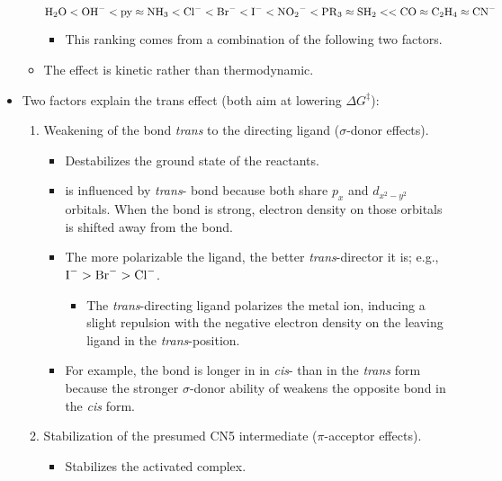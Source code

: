 \documentclass[../notes.tex]{subfiles}
\begin{document}
\begin{itemize}
\begin{itemize}
        \begin{equation*}
            \ce{H2O}<\ce{OH-}<\text{py}\approx\ce{NH3}<\ce{Cl-}<\ce{Br-}<\ce{I-}<\ce{NO2-}<\ce{PR3}\approx\ce{SH2}<<\ce{CO}\approx\ce{C2H4}\approx\ce{CN-}
        \end{equation*}
        \begin{itemize}
            \item This ranking comes from a combination of the following two factors.
        \end{itemize}
        \item The effect is kinetic rather than thermodynamic.
    \end{itemize}
    \item Two factors explain the trans effect (both aim at lowering $\Delta G^\ddagger$):
    \begin{enumerate}
        \item Weakening of the  bond \emph{trans} to the directing ligand ($\sigma$-donor effects).
        \begin{itemize}
            \item Destabilizes the ground state of the reactants.
            \item {} is influenced by \emph{trans}- bond because both share  $p_x$ and $d_{x^2-y^2}$ orbitals. When the  bond is strong, electron density on those orbitals is shifted away from the  bond.
            \item The more polarizable the  ligand, the better \emph{trans}-director it is; e.g., $\ce{I-}>\ce{Br-}>\ce{Cl-}$.
            \begin{itemize}
                \item The \emph{trans}-directing ligand polarizes the metal ion, inducing a slight repulsion with the negative electron density on the leaving ligand in the \emph{trans}-position.
            \end{itemize}
            \item For example, the  bond is longer in in \emph{cis}-\ce{[Pt(PMe3)2(Cl)2]} than in the \emph{trans} form because the stronger $\sigma$-donor ability of  weakens the opposite  bond in the \emph{cis} form.
        \end{itemize}
        \item Stabilization of the presumed CN5 intermediate ($\pi$-acceptor effects).
        \begin{itemize}
            \item Stabilizes the activated complex.

\end{itemize}
\end{enumerate}
\end{itemize}
\end{document}
